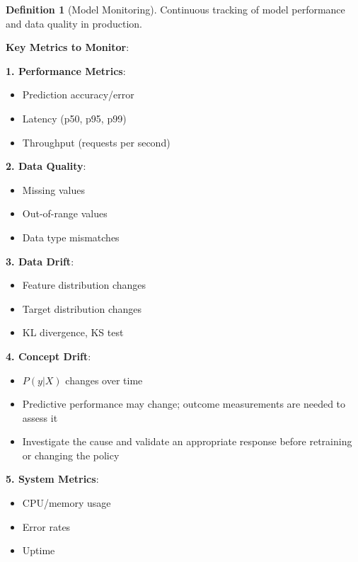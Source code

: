 \documentclass[11pt,twoside]{article}
\numberwithin{equation}{section}
\theoremstyle{plain}
\theoremstyle{definition}
\newtheorem{definition}[theorem]{Definition}
\theoremstyle{remark}
\begin{document}
\begin{definition}[Model Monitoring]
Continuous tracking of model performance and data quality in production.

\textbf{Key Metrics to Monitor}:

\textbf{1. Performance Metrics}:
\begin{itemize}
\item Prediction accuracy/error
\item Latency (p50, p95, p99)
\item Throughput (requests per second)
\end{itemize}

\textbf{2. Data Quality}:
\begin{itemize}
\item Missing values
\item Out-of-range values
\item Data type mismatches
\end{itemize}

\textbf{3. Data Drift}:
\begin{itemize}
\item Feature distribution changes
\item Target distribution changes
\item KL divergence, KS test
\end{itemize}

\textbf{4. Concept Drift}:
\begin{itemize}
\item $P(y|X)$ changes over time
\item Predictive performance may change; outcome measurements are needed to assess it
\item Investigate the cause and validate an appropriate response before retraining or changing the policy
\end{itemize}

\textbf{5. System Metrics}:
\begin{itemize}
\item CPU/memory usage
\item Error rates
\item Uptime
\end{itemize}
\end{definition}
\end{document}
